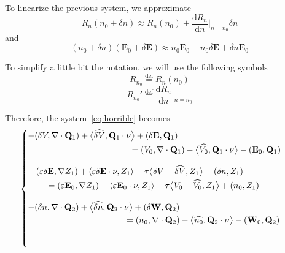 \documentclass[a4paper,12pt, draft]{article}
\newcommand{\Def}{\stackrel{\mathrm{def}}{=}}
\newcommand{\diver}[1]{\ensuremath{\nabla \cdot #1}}
\begin{document}
To linearize the previous system, we approximate
\[ R_n(n_{0} + \delta n) \approx R_n(n_0) + \frac{\mathrm{d}R_n}{\mathrm{d}n}|_{n =
n_0}\delta{}n \]
and
\[ \left(n_{0} + \delta n \right) \left(\mathbf{E}_{0} + \delta \mathbf{E}\right) \approx n_0
\mathbf{E}_0 + n_0 \delta{}\mathbf{E}  + \delta{}n \mathbf{E}_0 \]

To simplify a little bit the notation, we will use the following symbols
\[
 R_{n_0} \Def R_n(n_0)
\]
\[
 R_{n_0}' \Def \frac{\mathrm{d}R_n}{\mathrm{d}n}|_{n = n_0}
\]

Therefore, the system~\ref{eq:horrible} becomes
\begin{equation*}
 \begin{cases}
  \begin{aligned}
   -(\delta V, \diver{\mathbf{Q}_{1}}) + \big<\widehat{\delta V}, \mathbf{Q}_{1} \cdot \nu \big>
          + \left(\delta \mathbf{E}, \mathbf{Q}_{1} \right) \\
      & \hspace{-56.6pt} = (V_0, \diver{\mathbf{Q}_{1}}) - \big<\widehat{V_{0}}, \mathbf{Q}_{1}
          \cdot \nu \big> - \left(\mathbf{E}_{0}, \mathbf{Q}_{1} \right)
  \end{aligned} \\[20pt]
  \begin{aligned}
  - \left(\varepsilon\delta \mathbf{E}, \nabla Z_{1}\right) + \left<\varepsilon  \delta \mathbf{E}
          \cdot \nu, Z_{1}\right> + \tau \big< \delta V - \widehat{\delta V}, Z_{1} \big> -
          ( \delta n , Z_{1}) \\
      & \hspace{-230pt}  = \left(\varepsilon \mathbf{E}_{0}, \nabla Z_{1}\right)
          - \left<\varepsilon \mathbf{E}_{0} \cdot \nu, Z_{1}\right> - \tau \big< V_{0}
          - \widehat{V_{0}}, Z_{1} \big> + (n_{0}, Z_{1})
  \end{aligned} \\[20pt]
    \begin{aligned}
  -(\delta n, \diver{\mathbf{Q}_{2}}) + \big<\widehat{\delta n}, \mathbf{Q}_{2} \cdot \nu \big>
          + \left(\delta \mathbf{W}, \mathbf{Q}_{2} \right) \\
      & \hspace{-64.5pt} = (n_0, \diver{\mathbf{Q}_{2}}) - \big<\widehat{n_{0}}, \mathbf{Q}_{2}
          \cdot \nu \big> - \left(\mathbf{W}_{0}, \mathbf{Q}_{2} \right)
  \end{aligned} \\[20pt]
  \begin{aligned}

\end{aligned}
\end{cases}
\end{equation*}
\end{document}
